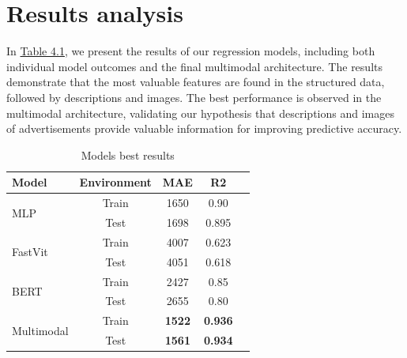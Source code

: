 \section{Results analysis}
In \hyperref[tab:best-results]{Table 4.1}, we present the results of our regression models, including both individual model outcomes and the final multimodal architecture. The results demonstrate that the most valuable features are found in the structured data, followed by descriptions and images. The best performance is observed in the multimodal architecture, validating our hypothesis that descriptions and images of advertisements provide valuable information for improving predictive accuracy.

\begin{table}[ht]
\centering
\begin{tabular}{lcccc}
    \textbf{Model} & \textbf{Environment} & \textbf{MAE} & \textbf{R2} \\ \hline
    \multirow{2}{*}{MLP} & Train & 1650 & 0.90 \\
                         & Test & 1698 & 0.895 \\ \hline
    \multirow{2}{*}{FastVit} & Train & 4007 & 0.623 \\
                             & Test & 4051 & 0.618 \\ \hline
    \multirow{2}{*}{BERT} & Train & 2427 & 0.85 \\
                          & Test & 2655 & 0.80 \\ \hline
    \multirow{2}{*}{Multimodal} & Train & \textbf{1522} & \textbf{0.936} \\
                                & Test & \textbf{1561} & \textbf{0.934} \\
\end{tabular}
\caption{Models best results}
\label{tab:best-results}
\end{table}
